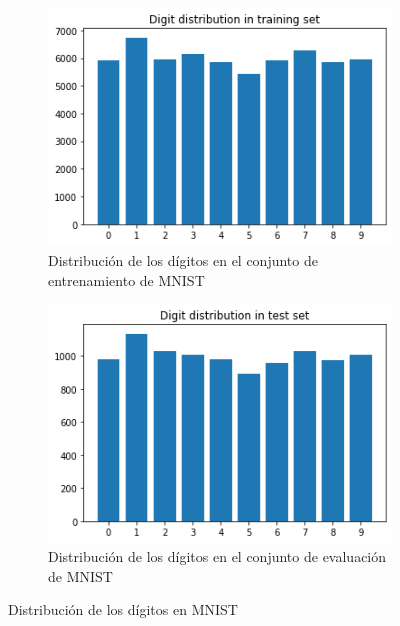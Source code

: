 \begin{figure}[h!]
    \centering
    \begin{subfigure}[b]{0.45\textwidth}
        \centering
        \includegraphics[width=\textwidth]{images/mnist/dist_train.png}
        \caption{Distribución de los dígitos en el conjunto de entrenamiento de MNIST}
        \label{mnist7}
    \end{subfigure}
    \hspace{1cm}
    \begin{subfigure}[b]{0.45\textwidth}
        \centering
        \includegraphics[width=\textwidth]{images/mnist/dist_test.png}
        \caption{Distribución de los dígitos en el conjunto de evaluación de MNIST}
        \label{mnist8}
    \end{subfigure}
    \caption{Distribución de los dígitos en MNIST}
    \label{mnist_dist}
\end{figure}

